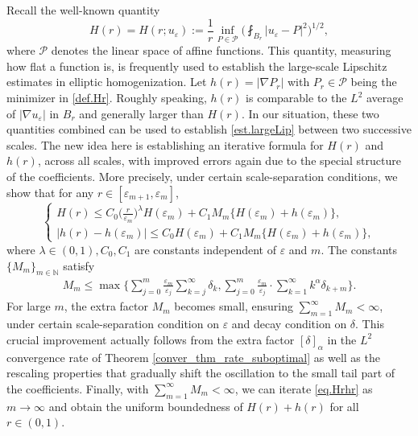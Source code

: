 \documentclass[reqno,12pt]{amsart} %
\theoremstyle{definition}
\theoremstyle{remark}
\numberwithin{equation}{section}
\newcommand{\N}{\mathbb{N}}
\newcommand{\e}{\varepsilon}
\begin{document}
Recall the well-known quantity
\begin{equation}\label{def.Hr}
    H(r) = H(r; u_\varepsilon) := \frac{1}{r}\inf_{P\in \mathcal{P}}\bigg(\fint_{B_r}|u_\varepsilon-P|^2\bigg)^{1/2},
\end{equation}
where $\mathcal{P}$ denotes the linear space of affine functions. This quantity, measuring how flat a function is, is frequently used to establish the large-scale Lipschitz estimates in elliptic homogenization. Let $h(r) = |\nabla P_r|$ with $P_r \in \mathcal{P}$ being the minimizer in \eqref{def.Hr}. Roughly speaking,  $h(r)$ is comparable to the $L^2$ average of $|\nabla u_\e|$ in $B_r$ and generally larger than $H(r)$. In our situation, these two quantities combined can be used to establish \eqref{est.largeLip} between two successive scales. The new idea here is  establishing an iterative formula for $H(r)$ and $h(r)$, across all scales, with improved errors again due to the special structure of the coefficients. More precisely, under certain scale-separation conditions, we show that for any $r \in [\e_{m+1}, \e_m]$,
\begin{equation}\label{eq.Hrhr}
    \begin{cases}
        \displaystyle H(r) \le C_0 \Big( \frac{r}{\e_m} \Big)^\lambda H(\e_m) + C_1 M_m \big\{ H(\e_m) + h(\e_m) \big\}, \\
        \displaystyle |h(r) - h(\e_m)| \le C_0 H(\e_m) + C_1 M_m \big\{ H(\e_m) + h(\e_m) \big\},
    \end{cases}
\end{equation}
where $\lambda \in (0,1), C_0, C_1$ are constants independent of $\e$ and $m$. The constants $\{M_m \}_{m\in \N}$ satisfy
\begin{align*}%
    M_m \le \max\bigg\{\sum_{j=0}^{m}\frac{\varepsilon_m}{\varepsilon_j}\sum_{k=j}^{\infty}\delta_k, \sum_{j=0}^m\frac{\varepsilon_m}{\varepsilon_j}\cdot\sum_{k=1}^\infty k^\alpha\delta_{k+m}\bigg\}.
\end{align*}
For large $m$, the extra factor $M_m$ becomes small, ensuring $\sum_{m = 1}^\infty M_m < \infty$, under certain scale-separation condition on $\e$ and decay condition on $\delta$. This crucial improvement actually follows from the extra factor $[\delta]_\alpha$ in the $L^2$ convergence rate of Theorem \ref{conver_thm_rate_suboptimal} as well as  the rescaling properties that gradually shift the oscillation to the small tail part of the coefficients. Finally, with $\sum_{m = 1}^\infty M_m < \infty$, we can iterate \eqref{eq.Hrhr} as $m\to \infty$ and obtain  the uniform boundedness of $H(r) + h(r)$ for all $r\in (0,1)$.
\end{document}
